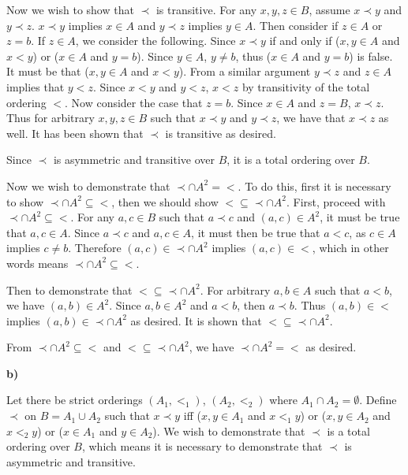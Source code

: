 \documentclass{article}
\begin{document}
\begin{enumerate}
\medskip

Now we wish to show that $\prec$ is transitive. For any $x,y,z \in B$, assume $x \prec y$ and $y \prec z$. $x \prec y$ implies $x \in A$ and $y \prec z$ implies $y \in A$. Then consider if $z \in A$ or $z = b$. If $z \in A$, we consider the following. Since $x \prec y$ if and only if ($x,y \in A$ and $x < y$) or ($x \in A$ and $y = b$). Since $y \in A$, $y \neq b$, thus ($x \in A$ and $y = b$) is false. It must be that ($x,y \in A$ and $x < y$). From a similar argument $y \prec z$ and $z \in A$ implies that $y < z$. Since $x < y$ and $y < z$, $x < z$ by transitivity of the total ordering $<$. Now consider the case that $z = b$. Since $x \in A$ and $z = B$, $x \prec z$. Thus for arbitrary $x,y,z \in B$ such that $x \prec y$ and $y \prec z$, we have that $x \prec z$ as well. It has been shown that $\prec$ is transitive as desired.

\medskip

Since $\prec$ is asymmetric and transitive over $B$, it is a total ordering over $B$.

\medskip

Now we wish to demonstrate that $\prec \cap A^{2} = <$. To do this, first it is necessary to show $\prec \cap A^{2} \subseteq <$, then we should show $< \subseteq \prec \cap A^{2}$. First, proceed with  $\prec \cap A^{2} \subseteq <$. For any $a,c \in B$ such that $a \prec c$ and $(a,c) \in A^{2}$, it must be true that $a,c \in A$. Since $a \prec c$ and $a,c \in A$, it must then be true that $a < c$, as $c \in A$ implies $c \neq b$. Therefore $(a,c) \in \prec \cap A^{2}$ implies $(a,c) \in <$, which in other words means $\prec \cap A^{2} \subseteq <$. 

\medskip

Then to demonstrate that $< \subseteq \prec \cap A^{2}$. For arbitrary $a,b \in A$ such that $a < b$, we have $(a,b) \in A^{2}$. Since $a,b \in A^{2}$ and $a < b$, then $a \prec b$. Thus $(a,b) \in <$ implies $(a,b) \in \prec \cap A^{2}$ as desired. It is shown that $< \subseteq \prec \cap A^{2}$.

\medskip

From $\prec \cap A^{2} \subseteq <$ and $< \subseteq \prec \cap A^{2}$, we have $\prec \cap A^{2} = <$ as desired.

\medskip 
\textbf{b)} 
\medskip

Let there be strict orderings $(A_1, <_{1})$, $(A_2, <_{2})$ where $A_1 \cap A_2 = \emptyset$. Define $\prec$ on $B = A_1 \cup A_2$ such that $x \prec y$ iff ($x,y \in A_1$ and $x <_{1} y$) or ($x,y \in A_2$ and $x<_{2} y$) or ($x \in A_{1}$ and $y \in A_{2}$). We wish to demonstrate that $\prec$ is a total ordering over $B$, which means it is necessary to demonstrate that $\prec$ is asymmetric and transitive.


\end{enumerate}
\end{document}
